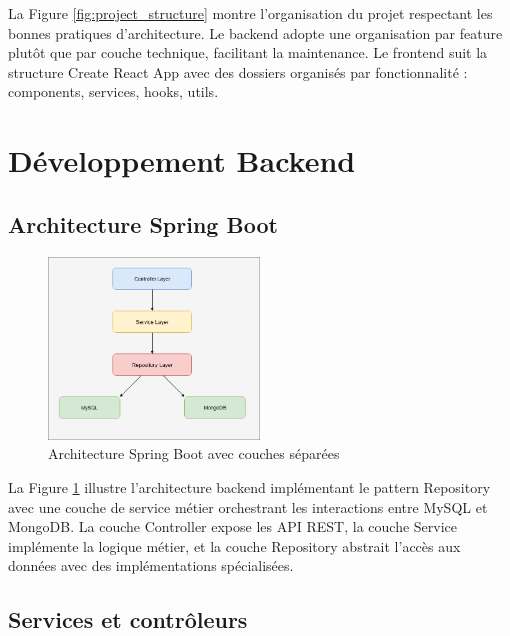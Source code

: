 La Figure \ref{fig:project_structure} montre l'organisation du projet respectant les bonnes pratiques d'architecture. Le backend adopte une organisation par feature plutôt que par couche technique, facilitant la maintenance. Le frontend suit la structure Create React App avec des dossiers organisés par fonctionnalité : components, services, hooks, utils.

\section{Développement Backend}

\subsection{Architecture Spring Boot}

\begin{figure}[H]
\centering
\includegraphics[width=0.5\textwidth]{images/spring_architecture.png}
\caption{Architecture Spring Boot avec couches séparées}
\label{fig:spring_architecture}
\end{figure}

La Figure \ref{fig:spring_architecture} illustre l'architecture backend implémentant le pattern Repository avec une couche de service métier orchestrant les interactions entre MySQL et MongoDB. La couche Controller expose les API REST, la couche Service implémente la logique métier, et la couche Repository abstrait l'accès aux données avec des implémentations spécialisées.

\subsection{Services et contrôleurs}

